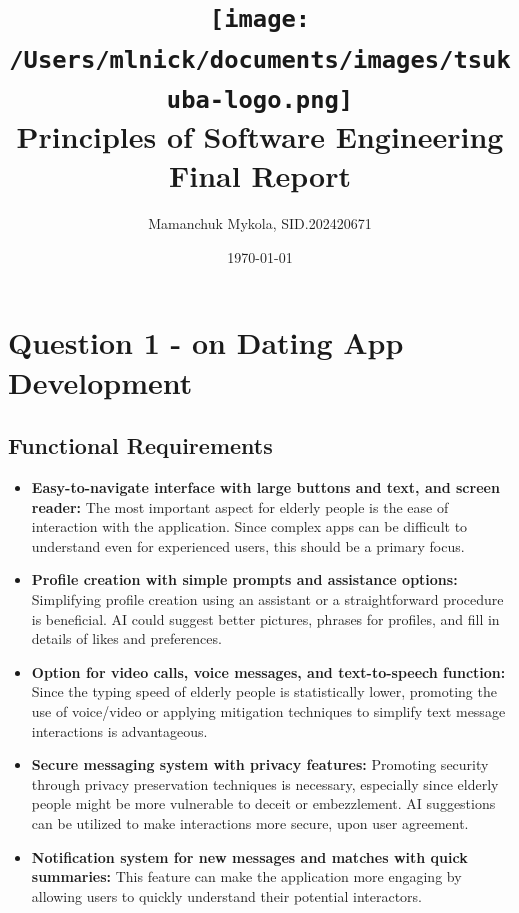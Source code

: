 \documentclass[12pt,a4paper]{article}
\title{
    \texttt{[image: /Users/mlnick/documents/images/tsukuba-logo.png]} \\
    \textbf{Principles of Software Engineering} \\
    \vspace{3mm}    
    Final Report
}
\author{Mamanchuk Mykola, SID.202420671}
\date{\today}
\begin{document}
\maketitle

\section{Question 1 - on Dating App Development}

\subsection{Functional Requirements}

\begin{itemize}
    \item \textbf{Easy-to-navigate interface with large buttons and text, and screen reader:} 
    The most important aspect for elderly people is the ease of interaction with the application. Since complex apps can be difficult to understand even for experienced users, this should be a primary focus.

    \item \textbf{Profile creation with simple prompts and assistance options:} 
    Simplifying profile creation using an assistant or a straightforward procedure is beneficial. AI could suggest better pictures, phrases for profiles, and fill in details of likes and preferences.

    \item \textbf{Option for video calls, voice messages, and text-to-speech function:} 
    Since the typing speed of elderly people is statistically lower, promoting the use of voice/video or applying mitigation techniques to simplify text message interactions is advantageous.

    \item \textbf{Secure messaging system with privacy features:} 
    Promoting security through privacy preservation techniques is necessary, especially since elderly people might be more vulnerable to deceit or embezzlement. AI suggestions can be utilized to make interactions more secure, upon user agreement.

    \item \textbf{Notification system for new messages and matches with quick summaries:} 
    This feature can make the application more engaging by allowing users to quickly understand their potential interactors.
\end{itemize}
\end{document}
